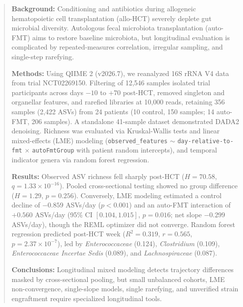 
\begin{abstract}
\textbf{Background:} Conditioning and antibiotics during allogeneic hematopoietic cell transplantation (allo-HCT) severely deplete gut microbial diversity. Autologous fecal microbiota transplantation (auto-FMT) aims to restore baseline microbiota, but longitudinal evaluation is complicated by repeated-measures correlation, irregular sampling, and single-step rarefying.

\textbf{Methods:} Using QIIME 2 (v2026.7), we reanalyzed 16S rRNA V4 data from trial NCT02269150. Filtering of 12,546 samples isolated trial participants across days $-10$ to $+70$ post-HCT, removed singleton and organellar features, and rarefied libraries at 10,000 reads, retaining 356 samples (2,422 ASVs) from 24 patients (10 control, 150 samples; 14 auto-FMT, 206 samples). A standalone 41-sample dataset demonstrated DADA2 denoising. Richness was evaluated via Kruskal-Wallis tests and linear mixed-effects (LME) modeling (\texttt{observed\_features} $\sim$ \texttt{day-relative-to-fmt} $\times$ \texttt{autoFmtGroup} with patient random intercepts), and temporal indicator genera via random forest regression.

\textbf{Results:} Observed ASV richness fell sharply post-HCT ($H = 70.58$, $q = 1.33 \times 10^{-16}$). Pooled cross-sectional testing showed no group difference ($H = 1.29$, $p = 0.256$). Conversely, LME modeling estimated a control decline of $-0.859$ ASVs/day ($p < 0.001$) and an auto-FMT interaction of $+0.560$ ASVs/day (95\% CI $[0.104, 1.015]$, $p = 0.016$; net slope $-0.299$ ASVs/day), though the REML optimizer did not converge. Random forest regression predicted post-HCT week ($R^2 = 0.319$, $r = 0.565$, $p = 2.37 \times 10^{-7}$), led by \textit{Enterococcaceae} (0.124), \textit{Clostridium} (0.109), \textit{Enterococcaceae Incertae Sedis} (0.089), and \textit{Lachnospiraceae} (0.087).

\textbf{Conclusions:} Longitudinal mixed modeling detects trajectory differences masked by cross-sectional pooling, but small unbalanced cohorts, LME non-convergence, single-slope models, single rarefying, and unverified strain engraftment require specialized longitudinal tools.
\end{abstract}

